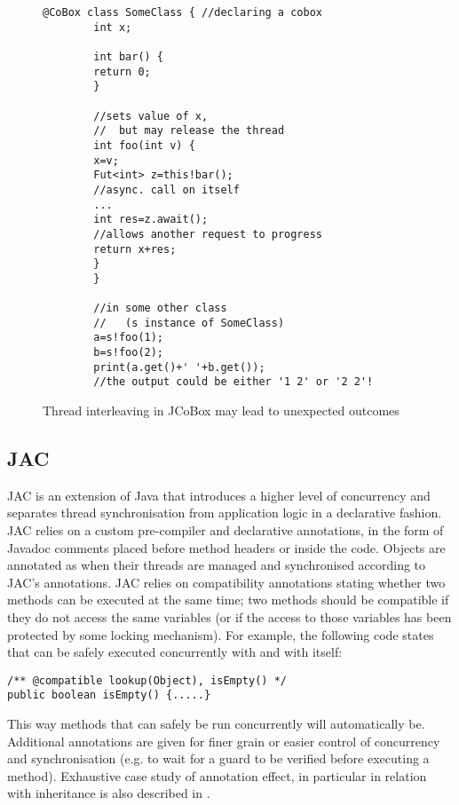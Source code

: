 \begin{figure}[t]
	\begin{small}
		\begin{lstlisting}[frame=single]
		@CoBox class SomeClass { //declaring a cobox
		int x;
		
		int bar() {
		return 0;
		}
		
		//sets value of x, 
		//  but may release the thread 
		int foo(int v) {
		x=v;
		Fut<int> z=this!bar();  
		//async. call on itself
		...
		int res=z.await(); 
		//allows another request to progress
		return x+res; 
		}
		}
		
		//in some other class 
		//   (s instance of SomeClass)
		a=s!foo(1);
		b=s!foo(2);
		print(a.get()+' '+b.get());
		//the output could be either '1 2' or '2 2'!
		\end{lstlisting}
	\end{small}
	\caption{Thread interleaving  in JCoBox may lead to unexpected outcomes}
	\label{jcobox_await_problem}
\end{figure}

\subsection{JAC}

JAC \cite{lohr2006jac}  is an extension of Java that introduces a
higher level of concurrency and separates thread synchronisation from
application logic in a declarative fashion. JAC relies on a custom
pre-compiler and declarative annotations, in the form of Javadoc
comments placed before method headers or inside the code. Objects are
annotated as  when their threads are managed and
synchronised according to JAC's annotations. JAC relies on
compatibility annotations stating whether two methods can be executed
at the same time; two methods should be compatible if they do not
access the same variables (or if the access to those variables has
been protected by some locking mechanism).  For example, the following
code states that  can be safely executed concurrently
with  and with itself:
\begin{lstlisting}
/** @compatible lookup(Object), isEmpty() */
public boolean isEmpty() {.....}
\end{lstlisting} 

This way methods that can safely be run concurrently will
automatically be. Additional annotations are given for finer grain or
easier control of concurrency and synchronisation (e.g. to wait for a
guard to be verified before executing a method).  Exhaustive case
study of annotation effect, in particular in relation with inheritance
is also described in \cite{lohr2006jac}.

